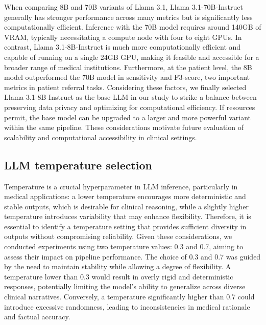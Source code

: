 \documentclass[fleqn,10pt]{wlscirep}
\begin{document}
When comparing 8B and 70B variants of Llama 3.1, Llama 3.1-70B-Instruct generally has stronger performance across many metrics but is significantly less computationally efficient. Inference with the 70B model requires around 140GB of VRAM, typically necessitating a compute node with four to eight GPUs. In contrast, Llama 3.1-8B-Instruct is much more computationally efficient and capable of running on a single 24GB GPU, making it feasible and accessible for a broader range of medical institutions. Furthermore, at the patient level, the 8B model outperformed the 70B model in sensitivity and F3-score, two important metrics in patient referral tasks. Considering these factors, we finally selected Llama 3.1-8B-Instruct as the base LLM in our study to strike a balance between preserving data privacy and  optimizing for computational efficiency. If resources permit, the base model can be upgraded to a larger and more powerful variant within the same pipeline. These considerations motivate future evaluation of scalability and computational accessibility in clinical settings.

\subsection*{LLM temperature selection}
Temperature is a crucial hyperparameter in LLM inference, particularly in medical applications: a lower temperature encourages more deterministic and stable outputs, which is desirable for clinical reasoning, while a slightly higher temperature introduces variability that may enhance flexibility. Therefore, it is essential to identify a temperature setting that provides sufficient diversity in outputs without compromising reliability. Given these considerations, we conducted experiments using two temperature values: 0.3 and 0.7, aiming to assess their impact on pipeline performance. The choice of 0.3 and 0.7 was guided by the need to maintain stability while allowing a degree of flexibility. A temperature lower than 0.3 would result in overly rigid and deterministic responses, potentially limiting the model’s ability to generalize across diverse clinical narratives. Conversely, a temperature significantly higher than 0.7 could introduce excessive randomness, leading to inconsistencies in medical rationale and factual accuracy. 
\end{document}
